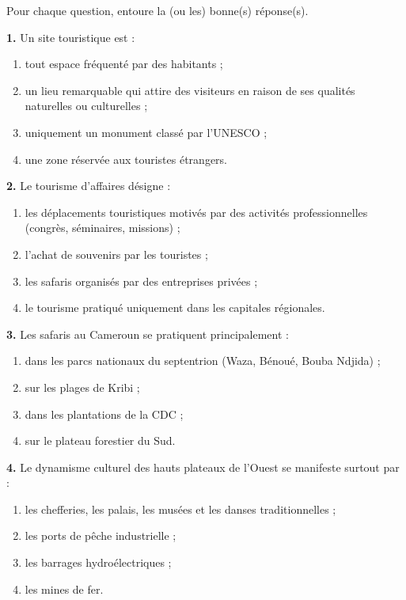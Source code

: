 \documentclass[11pt]{article}
\begin{document}
\begin{exercice}
Pour chaque question, entoure la (ou les) bonne(s) réponse(s).

\textbf{1.} Un site touristique est :
\begin{enumerate}[label=\alph*)]
\item tout espace fréquenté par des habitants ;
\item un lieu remarquable qui attire des visiteurs en raison de ses qualités naturelles ou culturelles ;
\item uniquement un monument classé par l'UNESCO ;
\item une zone réservée aux touristes étrangers.
\end{enumerate}

\textbf{2.} Le tourisme d'affaires désigne :
\begin{enumerate}[label=\alph*)]
\item les déplacements touristiques motivés par des activités professionnelles (congrès, séminaires, missions) ;
\item l'achat de souvenirs par les touristes ;
\item les safaris organisés par des entreprises privées ;
\item le tourisme pratiqué uniquement dans les capitales régionales.
\end{enumerate}

\textbf{3.} Les safaris au Cameroun se pratiquent principalement :
\begin{enumerate}[label=\alph*)]
\item dans les parcs nationaux du septentrion (Waza, Bénoué, Bouba Ndjida) ;
\item sur les plages de Kribi ;
\item dans les plantations de la CDC ;
\item sur le plateau forestier du Sud.
\end{enumerate}

\textbf{4.} Le dynamisme culturel des hauts plateaux de l'Ouest se manifeste surtout par :
\begin{enumerate}[label=\alph*)]
\item les chefferies, les palais, les musées et les danses traditionnelles ;
\item les ports de pêche industrielle ;
\item les barrages hydroélectriques ;
\item les mines de fer.
\end{enumerate}
\end{exercice}
\end{document}
